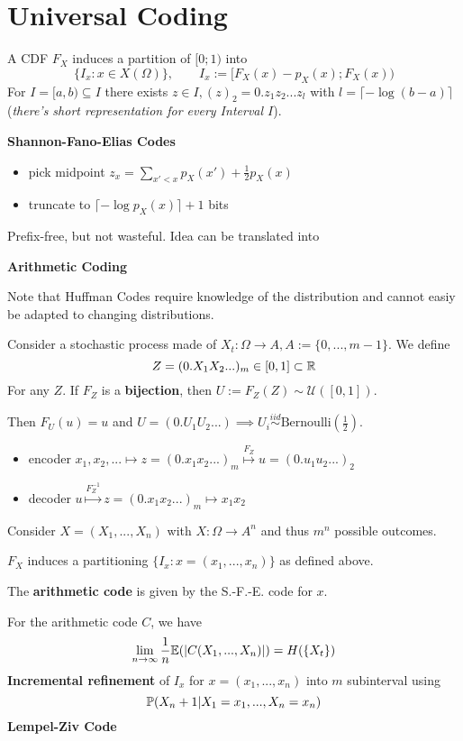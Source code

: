 \section{Universal Coding}

A CDF \(F_X\) induces a partition of \([0; 1)\) into 
\[\{I_x: x \in X(\Omega)\}, \qquad I_x := [F_X(x) - p_X(x); F_X(x))\]
For \(I = [a, b) \subseteq I\) there exists \(z \in I, (z)_2 = 0.z_1z_2...z_l\)
with \(l = \lceil - \log(b-a)\rceil\) (\textit{there's short representation for every Interval \(I\)}).

\textbf{Shannon-Fano-Elias Codes}
\begin{itemize}[label=-]
    \item pick midpoint \(z_x = \sum_{x' < x} p_X(x') + \frac{1}{2}p_X(x)\)
    \item truncate to \(\lceil - \log p_X(x) \rceil + 1\) bits
\end{itemize}
Prefix-free, but not wasteful. Idea can be translated into 

\textbf{Arithmetic Coding}

Note that Huffman Codes require knowledge of the distribution and cannot easiy be adapted to changing distributions.

Consider a stochastic process made of \(X_t: \Omega \to A, A := \{0, ..., m-1\}\). We define 
\[Z = (0.X_1X_2...)_m \in [0, 1] \subset \R\]
For any \(Z\). If \(F_Z\) is a \textbf{bijection}, then \(U := F_Z(Z) \sim \mathcal{U}([0,1])\).

Then \(F_U(u) = u\) and \(U = (0.U_1U_2...) \implies U_i \overset{iid}{\sim} \text{Bernoulli}\left(\frac{1}{2}\right)\).

\begin{itemize}[label=-]
    \item encoder \(x_1, x_2,... \mapsto z = (0.x_1x_2...)_m \overset{F_Z}{\mapsto} u = (0.u_1u_2...)_2\)
    \item decoder \(u \overset{F_Z^{-1}}{\mapsto} z = (0.x_1x_2...)_m \mapsto x_1x_2\)
\end{itemize}

Consider \(X =(X_1, ...,X_n)\) with \(X: \Omega \to A^n\) and thus \(m^n\) possible outcomes.

\(F_X\) induces a partitioning \(\{I_x: x = (x_1, ..., x_n)\}\) as defined above.

The \textbf{arithmetic code} is given by the S.-F.-E. code for \(x\).

For the arithmetic code \(C\), we have
\[\lim_{n \to \infty} \frac{1}{n}\E(|C(X_1, ..., X_n)|) = H(\{X_t\})\]
\textbf{Incremental refinement} of \(I_x\) for \(x=(x_1,...,x_n)\) into \(m\) subinterval using 
\[\P(X_n+1 | X_1 = x_1, ..., X_n = x_n)\] 
\textbf{Lempel-Ziv Code}

